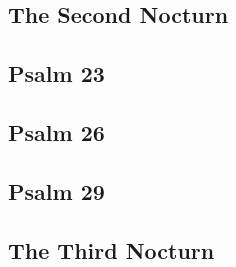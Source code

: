 \documentclass[12pt, a5paper]{book}
\begin{document}
\subsection{The Second Nocturn}





\subsection{Psalm 23}






\pagebreak




\subsection{Psalm 26}




\pagebreak



\subsection{Psalm 29}

















\begin {center}\end{center}

\subsection{The Third Nocturn}
\end{document}
